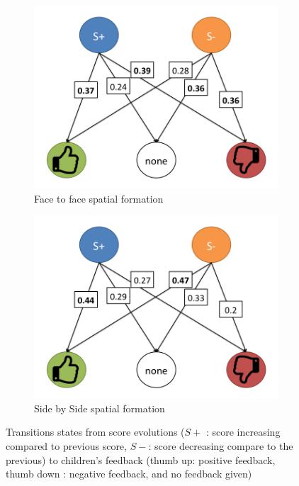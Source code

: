 \documentclass[letterpaper, 10 pt, conference]{ieeeconf}  %
\begin{document}
\begin{figure}
	\centering
	\begin{subfigure}{0.5\textwidth}
		\centering
		\includegraphics[width=0.8\linewidth]{./figures/states/states_f2f}
		\caption{Face to face spatial formation}
		\label{fig:f2fstate}
	\end{subfigure}%
	\begin{subfigure}{0.5\textwidth}
		\centering
		\includegraphics[width=0.8\linewidth]{./figures/states/statess_sbs}
		\caption{Side by Side spatial formation}
		\label{fig:sbsstate}
	\end{subfigure}
	\caption{Transitions states from score evolutions ($S+$ : score increasing compared to previous score, $S-$: score decreasing compare to the previous) to children's feedback (thumb up: positive feedback, thumb down : negative feedback, and no feedback given)}
	\label{fig:state}
\end{figure}
\end{document}
